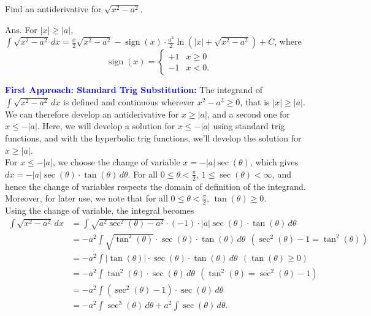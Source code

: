 \bigskip
\begin{example}
 Find an antiderivative for  \( \sqrt{x^2 - a^2} \).
\end{example}

\solution Ans. For $|x|\ge |a|$, $\int \sqrt{x^2 - a^2}\, dx = \frac{x}{2}\sqrt{x^2 - a^2} - \operatorname{sign}(x) \cdot \frac{a^2}{2} \ln\left( |x| + \sqrt{x^2 - a^2} \right) + C$, where 
$$ \operatorname{sign}(x) = \begin{cases}
    +1 & x \ge 0 \\
    -1 & x<0.     
\end{cases}$$

\textcolor{blue}{\bf First Approach: Standard Trig Substitution:} The integrand of \( \int \sqrt{x^2 - a^2} \, dx \) is defined and continuous wherever \( x^2 - a^2 \ge 0 \), that is \( |x| \ge |a| \). We can therefore develop an antiderivative for $x \ge |a|$, and a second one for $x \le -|a|$. Here, we will develop a solution for $x \le -|a|$ using standard trig functions, and with the hyperbolic trig functions, we'll develop the solution for $x \ge |a|$.\\


For $x \le - |a|$, we choose the change of variable \( x = -|a| \sec(\theta) \), which gives \( dx = -|a| \sec(\theta)\cdot \tan(\theta) \, d\theta \). For all $0 \le \theta < \frac{\pi}{2}$, $ 1 \le \sec(\theta) < \infty$, and hence the change of variables respects the domain of definition of the integrand. Moreover, for later use, we note that for all $0 \le \theta < \frac{\pi}{2}$, $\tan(\theta) \ge 0$.\\

Using the change of variable, the integral becomes
\begin{align*}
   \int \sqrt{x^2 - a^2} \, dx  &=  \int \sqrt{a^2 \sec^2(\theta) - a^2} \cdot (-1)\cdot|a| \sec(\theta)\cdot \tan(\theta) \, d\theta\\[1em]
   &= -a^2 \int \sqrt{\tan^2(\theta)} \cdot \sec(\theta)\cdot \tan(\theta) \, d\theta ~~(\sec^2(\theta) - 1 = \tan^2(\theta)) \\[1em]
     &= -a^2 \int | \tan(\theta) | \cdot \sec(\theta)\cdot \tan(\theta) \, d\theta  ~~(\tan(\theta) \ge 0)\\[1em]
    &= -a^2 \int \tan^2(\theta) \cdot \sec(\theta) \, d\theta  ~~(\tan^2(\theta) = \sec^2(\theta) - 1)\\
    &= -a^2 \int \left( \sec^2(\theta) -1 \right)\cdot \sec(\theta) \, d\theta\\
     &=  - a^2 \int \sec^3(\theta) \, d\theta + a^2 \int \sec(\theta) \, d\theta.
\end{align*}


